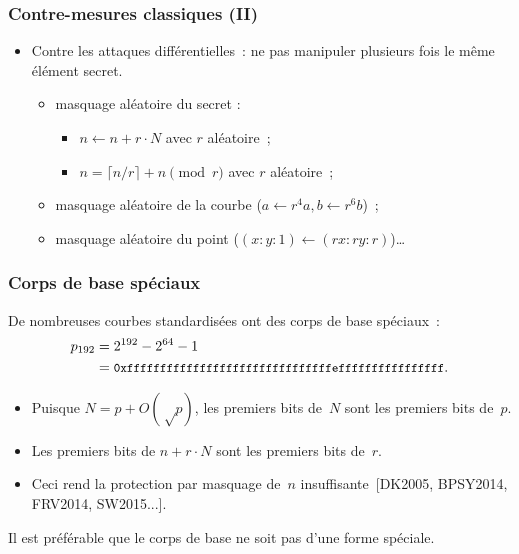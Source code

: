 \documentclass[francais]{beamer}
\newcommand{\bib}[1]{{\usebeamercolor{emph}\textcolor{fg}{~[#1]}}}
\begin{document}
\begin{frame}\frametitle{Contre-mesures classiques (II)}
\begin{itemize}
\item Contre les attaques différentielles :
ne pas manipuler plusieurs fois le même élément secret.
\begin{itemize}
\item masquage aléatoire du secret :
\begin{itemize}
\item $n ← n + r · N$ avec $r$ aléatoire ;
\item $n = \lceil n / r \rceil + n \pmod{r}$ avec $r$ aléatoire ;
\end{itemize}
\item masquage aléatoire de la courbe ($a ← r^4 a, b ← r^6 b$) ;
\item masquage aléatoire du point ($(x:y:1) ← (rx:ry:r)$)\ldots
\end{itemize}
\end{itemize}
\end{frame}

\begin{frame}\frametitle{Corps de base spéciaux}
De nombreuses courbes standardisées ont des corps de base spéciaux :
\[\begin{split} p_{192} &= 2^{192} - 2^{64} - 1\\
&= \texttt{\small 0xfffffffffffffffffffffffffffffffeffffffffffffffff}.
\end{split}\]
\begin{itemize}
\item Puisque $N = p + O(√p)$,
les premiers bits de~$N$ sont les premiers bits de~$p$.
\item Les premiers bits de $n + r · N$
sont les premiers bits de~$r$.
\item Ceci rend la protection par masquage de~$n$
insuffisante\bib{DK2005, BPSY2014, FRV2014, SW2015...}.
\end{itemize}

\begin{block}{}
Il est préférable que le corps de base ne soit pas d'une forme
spéciale.
\end{block}
\end{frame}
\end{document}
